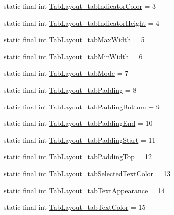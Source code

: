 \begin{DoxyCompactItemize}
\item 
static final int \mbox{\hyperlink{classandroid_1_1support_1_1design_1_1R_1_1styleable_a9b013b480dde8c6e5d57cd6ebd0d0f53}{Tab\+Layout\+\_\+tab\+Indicator\+Color}} = 3
\item 
static final int \mbox{\hyperlink{classandroid_1_1support_1_1design_1_1R_1_1styleable_a7ae176dd4e8e0311f4bfa88d08f2691a}{Tab\+Layout\+\_\+tab\+Indicator\+Height}} = 4
\item 
static final int \mbox{\hyperlink{classandroid_1_1support_1_1design_1_1R_1_1styleable_a3eb1307137e3900d48a4bc5a2f5a739f}{Tab\+Layout\+\_\+tab\+Max\+Width}} = 5
\item 
static final int \mbox{\hyperlink{classandroid_1_1support_1_1design_1_1R_1_1styleable_a3602c5888987ab2e5b541ec404fd7f6d}{Tab\+Layout\+\_\+tab\+Min\+Width}} = 6
\item 
static final int \mbox{\hyperlink{classandroid_1_1support_1_1design_1_1R_1_1styleable_a26a51530c7b6149480742863d85d168a}{Tab\+Layout\+\_\+tab\+Mode}} = 7
\item 
static final int \mbox{\hyperlink{classandroid_1_1support_1_1design_1_1R_1_1styleable_a056f2b88be834bf619bf77c735cf5a42}{Tab\+Layout\+\_\+tab\+Padding}} = 8
\item 
static final int \mbox{\hyperlink{classandroid_1_1support_1_1design_1_1R_1_1styleable_ad4991690d110e7f1385ee3f9d1a5b85b}{Tab\+Layout\+\_\+tab\+Padding\+Bottom}} = 9
\item 
static final int \mbox{\hyperlink{classandroid_1_1support_1_1design_1_1R_1_1styleable_adbeb0bd64f8e4ad9368fe2a1b099b617}{Tab\+Layout\+\_\+tab\+Padding\+End}} = 10
\item 
static final int \mbox{\hyperlink{classandroid_1_1support_1_1design_1_1R_1_1styleable_a0d9cc14d7d2c3237d4b22dd1fae200ba}{Tab\+Layout\+\_\+tab\+Padding\+Start}} = 11
\item 
static final int \mbox{\hyperlink{classandroid_1_1support_1_1design_1_1R_1_1styleable_a703b4a603e37f5394dd946d44278424c}{Tab\+Layout\+\_\+tab\+Padding\+Top}} = 12
\item 
static final int \mbox{\hyperlink{classandroid_1_1support_1_1design_1_1R_1_1styleable_ae1d2a6b701002c2b0ac537ba670c9494}{Tab\+Layout\+\_\+tab\+Selected\+Text\+Color}} = 13
\item 
static final int \mbox{\hyperlink{classandroid_1_1support_1_1design_1_1R_1_1styleable_a2b960a4f2c5c0cd6831652cc2cf9844d}{Tab\+Layout\+\_\+tab\+Text\+Appearance}} = 14
\item 
static final int \mbox{\hyperlink{classandroid_1_1support_1_1design_1_1R_1_1styleable_a5dee3b9d7a0f68858b1fd00fe184d831}{Tab\+Layout\+\_\+tab\+Text\+Color}} = 15

\end{DoxyCompactItemize}
